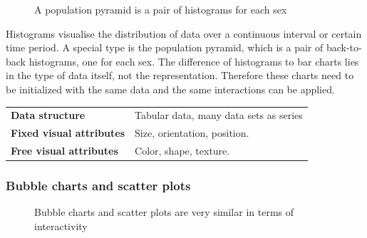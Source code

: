 \documentclass{article}
\newcommand{\conceptTable}[3]{%
    \begin{center}
    {\small
        \begin{tabulary}{\textwidth}{ll}
            \bf Data structure & #1 \\

            \bf Fixed visual attributes & #2 \\

            \bf Free visual attributes & #3  \\
        \end{tabulary}
    }
    \end{center}
}
\begin{document}
\begin{figure}
  \centering
    \qquad
    \caption{A population pyramid is a pair of histograms for each sex}%
    \label{fig:concept:chart-types:histograms}
\end{figure}

Histograms visualise the distribution of data over a continuous interval or certain time period.
A special type is the population pyramid, which is a pair of back-to-back histograms, one for each sex.
The difference of histograms to bar charts lies in the type of data itself, not the representation.
Therefore these charts need to be initialized with the same data and the same interactions can be applied.

\conceptTable{Tabular data, many data sets as series}{Size, orientation, position.}{Color, shape, texture.}

\subsubsection{Bubble charts and scatter plots}

\begin{figure}
  \centering
    \qquad
    \caption{Bubble charts and scatter plots are very similar in terms of interactivity}%
    \label{fig:concept:chart-types:bubble-chart}
\end{figure}
\end{document}
